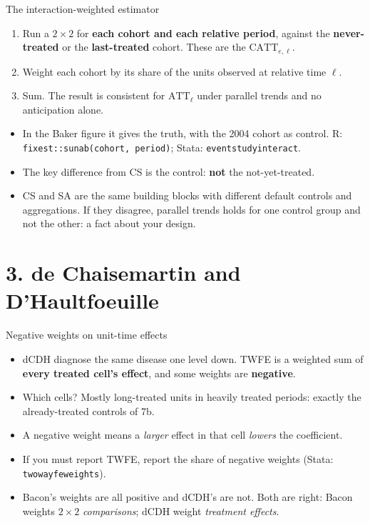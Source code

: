 \documentclass[
  11pt,
  ignorenonframetext,
  aspectratio=169,
]{beamer}
\providecommand{\tightlist}{%
  \setlength{\itemsep}{0pt}\setlength{\parskip}{0pt}}
\begin{document}
\begin{frame}[fragile]{The interaction-weighted estimator}
\protect{}\label{the-interaction-weighted-estimator}
\begin{enumerate}
\tightlist
\item
  Run a \(2 \times 2\) for \textbf{each cohort and each relative
  period}, against the \textbf{never-treated} or the
  \textbf{last-treated} cohort. These are the \(\text{CATT}_{e,\ell}\).
\item
  Weight each cohort by its share of the units observed at relative time
  \(\ell\).
\item
  Sum. The result is consistent for \(\text{ATT}_\ell\) under parallel
  trends and no anticipation alone.
\end{enumerate}

\vspace{0.3em}

\begin{itemize}
\tightlist
\item
  In the Baker figure it gives the truth, with the 2004 cohort as
  control. R: \texttt{fixest::sunab(cohort,\ period)}; Stata:
  \texttt{eventstudyinteract}.
\item
  The key difference from CS is the control: \textbf{not} the
  not-yet-treated.
\item
  CS and SA are the same building blocks with different default controls
  and aggregations. If they disagree, parallel trends holds for one
  control group and not the other: a fact about your design.
\end{itemize}
\end{frame}

\section{3. de Chaisemartin and
D'Haultfoeuille}\label{de-chaisemartin-and-dhaultfoeuille}

\begin{frame}[fragile]{Negative weights on unit-time effects}
\protect{}\label{negative-weights-on-unit-time-effects}
\begin{itemize}
\tightlist
\item
  dCDH diagnose the same disease one level down. TWFE is a weighted sum
  of \textbf{every treated cell's effect}, and some weights are
  \textbf{negative}.
\item
  Which cells? Mostly long-treated units in heavily treated periods:
  exactly the already-treated controls of 7b.
\item
  A negative weight means a \emph{larger} effect in that cell
  \emph{lowers} the coefficient.
\item
  If you must report TWFE, report the share of negative weights (Stata:
  \texttt{twowayfeweights}).
\item
  Bacon's weights are all positive and dCDH's are not. Both are right:
  Bacon weights \(2 \times 2\) \emph{comparisons}; dCDH weight
  \emph{treatment effects}.
\end{itemize}
\end{frame}
\end{document}
